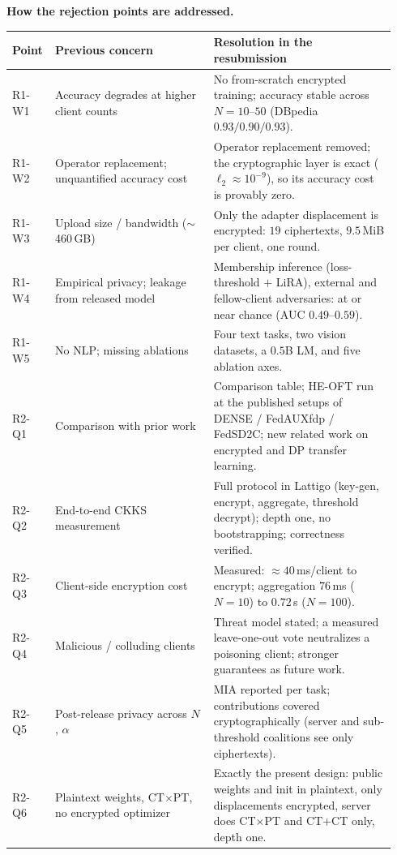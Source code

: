\documentclass[10pt]{article}
\begin{document}
\textbf{How the rejection points are addressed.}

{\scriptsize
\renewcommand{\arraystretch}{0.96}
\setlength{\tabcolsep}{4pt}
\begin{tabular}{@{}p{0.085\linewidth}p{0.40\linewidth}p{0.46\linewidth}@{}}
\toprule
Point & Previous concern & Resolution in the resubmission \\
\midrule
R1-W1 & Accuracy degrades at higher client counts & No from-scratch encrypted training; accuracy stable across
$N\!=\!10$--$50$ (DBpedia $0.93/0.90/0.93$). \\
R1-W2 & Operator replacement; unquantified accuracy cost & Operator replacement removed; the cryptographic
layer is exact ($\ell_2\!\approx\!10^{-9}$), so its accuracy cost is provably zero. \\
R1-W3 & Upload size / bandwidth ($\sim$460\,GB) & Only the adapter displacement is encrypted: $19$
ciphertexts, $9.5$\,MiB per client, one round. \\
R1-W4 & Empirical privacy; leakage from released model & Membership inference (loss-threshold $+$ LiRA),
external and fellow-client adversaries: at or near chance (AUC $0.49$--$0.59$). \\
R1-W5 & No NLP; missing ablations & Four text tasks, two vision datasets, a $0.5$B LM, and five ablation axes.\\
\midrule
R2-Q1 & Comparison with prior work & Comparison table; HE-OFT run at the published setups of DENSE /
FedAUXfdp / FedSD2C; new related work on encrypted and DP transfer learning. \\
R2-Q2 & End-to-end CKKS measurement & Full protocol in Lattigo (key-gen, encrypt, aggregate, threshold
decrypt); depth one, no bootstrapping; correctness verified. \\
R2-Q3 & Client-side encryption cost & Measured: $\approx\!40$\,ms/client to encrypt; aggregation $76$\,ms
($N\!=\!10$) to $0.72$\,s ($N\!=\!100$). \\
R2-Q4 & Malicious / colluding clients & Threat model stated; a measured leave-one-out vote neutralizes a
poisoning client; stronger guarantees as future work. \\
R2-Q5 & Post-release privacy across $N$, $\alpha$ & MIA reported per task; contributions covered
cryptographically (server and sub-threshold coalitions see only ciphertexts). \\
R2-Q6 & Plaintext weights, CT$\times$PT, no encrypted optimizer & Exactly the present design: public weights
and init in plaintext, only displacements encrypted, server does CT$\times$PT and CT$+$CT only, depth one. \\

\end{tabular}}
\end{document}
